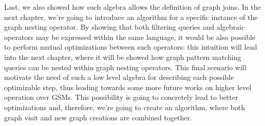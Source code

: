 Last, we also showed how such algebra allows the definition of graph joins. In the next chapter, we're going to introduce an algorithm for a specific instance of the graph nesting operator.  By showing that both filtering queries and algebraic operators may be expressed within the same language, it would be also possible to perform mutual optimizations between such operators: this intuition will lead into the next chapter, where it will be showed how graph pattern matching queries can be nested within graph nesting operators. This final scenario will motivate the need of such a low level algebra for describing each possible optimizable step, thus leading towards some more future works on higher level operation over GSMs. This possibility is going to concretely lead to better optimizations and, therefore, we're going to create an algorithm, where both graph visit and new graph creations are combined together.
